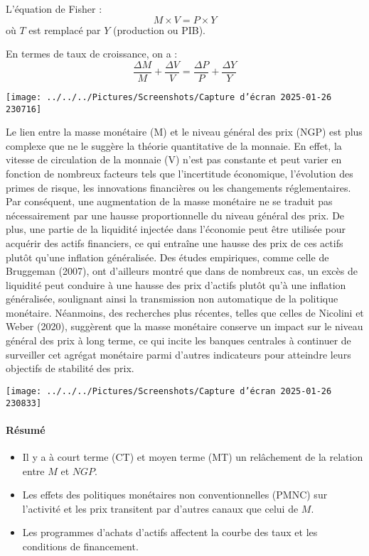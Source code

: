 \documentclass[a4paper, 12pt]{report}
\begin{document}
L'équation de Fisher :  
\[
M \times V = P \times Y
\]
où \( T \) est remplacé par \( Y \) (production ou PIB).  

En termes de taux de croissance, on a :  
\[
\frac{\Delta M}{M} + \frac{\Delta V}{V} = \frac{\Delta P}{P} + \frac{\Delta Y}{Y}
\]

\begin{center}
	\texttt{[image: ../../../Pictures/Screenshots/Capture d'écran 2025-01-26 230716]}
\end{center}
	
Le lien entre la masse monétaire (M) et le niveau général des prix (NGP) est plus complexe que ne le suggère la théorie quantitative de la monnaie. En effet, la vitesse de circulation de la monnaie (V) n'est pas constante et peut varier en fonction de nombreux facteurs tels que l'incertitude économique, l'évolution des primes de risque, les innovations financières ou les changements réglementaires. Par conséquent, une augmentation de la masse monétaire ne se traduit pas nécessairement par une hausse proportionnelle du niveau général des prix. De plus, une partie de la liquidité injectée dans l'économie peut être utilisée pour acquérir des actifs financiers, ce qui entraîne une hausse des prix de ces actifs plutôt qu'une inflation généralisée. Des études empiriques, comme celle de Bruggeman (2007), ont d'ailleurs montré que dans de nombreux cas, un excès de liquidité peut conduire à une hausse des prix d'actifs plutôt qu'à une inflation généralisée, soulignant ainsi la transmission non automatique de la politique monétaire. Néanmoins, des recherches plus récentes, telles que celles de Nicolini et Weber (2020), suggèrent que la masse monétaire conserve un impact sur le niveau général des prix à long terme, ce qui incite les banques centrales à continuer de surveiller cet agrégat monétaire parmi d'autres indicateurs pour atteindre leurs objectifs de stabilité des prix.
	
\begin{center}
	\texttt{[image: ../../../Pictures/Screenshots/Capture d'écran 2025-01-26 230833]}
\end{center}	


\paragraph{Résumé}
\begin{itemize}
	\item Il y a à court terme (CT) et moyen terme (MT) un relâchement de la relation entre \(M\) et \(NGP\).
	\item Les effets des politiques monétaires non conventionnelles (PMNC) sur l'activité et les prix transitent par d'autres canaux que celui de \(M\).
	\item Les programmes d'achats d'actifs affectent la courbe des taux et les conditions de financement.
\end{itemize}
\end{document}
